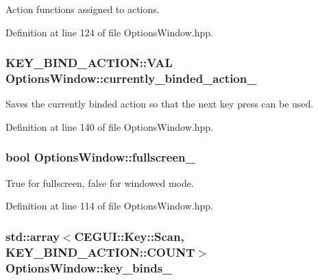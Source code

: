Action functions assigned to actions. 



Definition at line 124 of file Options\+Window.\+hpp.

\subsubsection[{\texorpdfstring{currently\+\_\+binded\+\_\+action\+\_\+}{currently_binded_action_}}]{\setlength{\rightskip}{0pt plus 5cm}K\+E\+Y\+\_\+\+B\+I\+N\+D\+\_\+\+A\+C\+T\+I\+O\+N\+::\+V\+AL Options\+Window\+::currently\+\_\+binded\+\_\+action\+\_\+\hspace{0.3cm}{\ttfamily [private]}}\hypertarget{class_options_window_a62f3d533394c12986766deb0e73794c2}{}\label{class_options_window_a62f3d533394c12986766deb0e73794c2}


Saves the currently binded action so that the next key press can be used. 



Definition at line 140 of file Options\+Window.\+hpp.

\subsubsection[{\texorpdfstring{fullscreen\+\_\+}{fullscreen_}}]{\setlength{\rightskip}{0pt plus 5cm}bool Options\+Window\+::fullscreen\+\_\+\hspace{0.3cm}{\ttfamily [private]}}\hypertarget{class_options_window_a536d5e2d5cc3f8c419836e1e5ff80423}{}\label{class_options_window_a536d5e2d5cc3f8c419836e1e5ff80423}


True for fullscreen, false for windowed mode. 



Definition at line 114 of file Options\+Window.\+hpp.

\subsubsection[{\texorpdfstring{key\+\_\+binds\+\_\+}{key_binds_}}]{\setlength{\rightskip}{0pt plus 5cm}std\+::array$<$C\+E\+G\+U\+I\+::\+Key\+::\+Scan, K\+E\+Y\+\_\+\+B\+I\+N\+D\+\_\+\+A\+C\+T\+I\+O\+N\+::\+C\+O\+U\+NT$>$ Options\+Window\+::key\+\_\+binds\+\_\+\hspace{0.3cm}{\ttfamily [private]}}\hypertarget{class_options_window_a1727e50166ba8b67f5f97f6213e0f80d}{}\label{class_options_window_a1727e50166ba8b67f5f97f6213e0f80d}


